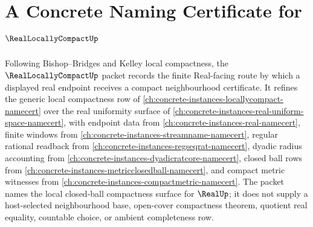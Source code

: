 \chapter{A Concrete Naming Certificate for $\RealLocallyCompactUp$}
\label{ch:concrete-instances-real-locally-compact-namecert}

Following Bishop--Bridges and Kelley local compactness, the $\RealLocallyCompactUp$ packet records the finite Real-facing route by which a displayed real endpoint receives a compact neighbourhood certificate. It refines the generic local compactness row of \autoref{ch:concrete-instances-locallycompact-namecert} over the real uniformity surface of \autoref{ch:concrete-instances-real-uniform-space-namecert}, with endpoint data from \autoref{ch:concrete-instances-real-namecert}, finite windows from \autoref{ch:concrete-instances-streamname-namecert}, regular rational readback from \autoref{ch:concrete-instances-regseqrat-namecert}, dyadic radius accounting from \autoref{ch:concrete-instances-dyadicratcore-namecert}, closed ball rows from \autoref{ch:concrete-instances-metricclosedball-namecert}, and compact metric witnesses from \autoref{ch:concrete-instances-compactmetric-namecert}. The packet names the local closed-ball compactness surface for $\RealUp$; it does not supply a host-selected neighbourhood base, open-cover compactness theorem, quotient real equality, countable choice, or ambient completeness row.

